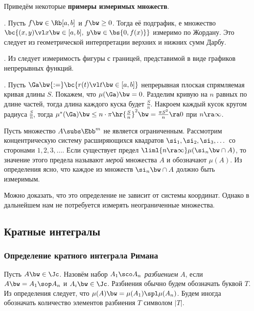 \documentclass[a4paper]{article}
\begin{document}
Приведём некоторые \textbf{примеры измеримых множеств}.

. Пусть $f \bw\in \Rb[a,b]$ и $f \bw\ge 0$. Тогда её подграфик, е множество $\bc{(x,y) \vl x \bw\in
[a,b], \; y\bw\in \bs{0, f(x)}}$ измеримо по Жордану. Это следует из геометрической интерпретации
верхних и нижних сумм Дарбу.

. Из  следует измеримость фигуры с границей, представимой в виде графиков непрерывных функций.

. Пусть $\Ga \bw{:=}\bc{r(t) \vl t \bw\in [a,b]}$ непрерывная плоская спрямляемая кривая
длины $S$. Покажем, что $\mu(\Ga) \bw= 0$. Разделим кривую на $n$ равных по длине частей, тогда длина
каждого куска будет $\frac{S}{n}$. Накроем каждый кусок кругом радиуса $\frac{S}{n}$, тогда
$\mu^*(\Ga) \bw\le n \cdot \pi\hr{\frac{S}{n}}^2 \bw= \frac{\pi S^2}{n} \ra 0$ при $n \ra \infty$.

\begin{df}
Пусть множество $A \subs \Ebb^m$ не является ограниченным. Рассмотрим концентрическую систему расширяющихся
квадратов $\si_1,\si_2,\si_3,\dots$ со сторонами $1, 2, 3, \dots$. Если существует предел $\liml{n
\ra \infty} \mu(\si_n \bw\cap A)$, то значение этого предела называют \emph{мерой} множества $A$ и
обозначают $\mu(A)$. Из определения ясно, что каждое из множеств $\si_n \bw\cap A$ должно быть
измеримым.
\end{df}

\begin{note}
Можно доказать, что это определение не зависит от системы координат. Однако в дальнейшем нам
не потребуется измерять неограниченные множества.
\end{note}

\subsection{Кратные интегралы}

\subsubsection{Определение кратного интеграла Римана}

\begin{df}
Пусть $A \bw\in \Jc$. Назовём набор $A_1\sco A_n$ \emph{разбиением} $A$, если $A \bw= A_1 \sop A_n$ и
$A_i \bw\in \Jc$. Разбиения обычно будем обозначать буквой $T$. Из определения следует, что $\mu(A) \bw=
\mu(A_1)\spl \mu(A_n)$. Будем иногда обозначать количество элементов разбиения $T$ символом $|T|$.
\end{df}
\end{document}
